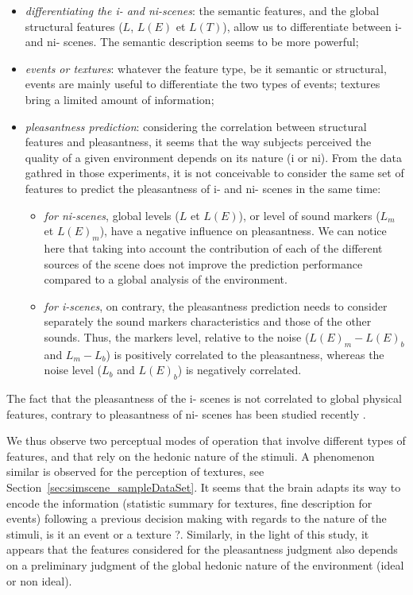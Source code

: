 \documentclass[twoside,twocolumn]{article}
\begin{document}
\begin{itemize}
\item \emph{differentiating the i- and ni-scenes}: the semantic features, and the global structural features ($L$, $L(E)$ et $L(T)$), allow us to differentiate between i- and ni- scenes. The semantic description seems to be more powerful;
\item \emph{events or textures}: whatever the feature type, be it semantic or structural, events are mainly useful to differentiate the two types of events; textures bring a limited amount of information;
\item \emph{pleasantness prediction}: considering the correlation between structural features and pleasantness, it seems that the way subjects perceived the quality of a given environment depends on its nature (i or ni). From the data gathred in those experiments, it is not conceivable to consider the same set of features to predict the pleasantness of i- and ni- scenes in the same time:

\begin{itemize}

\item \emph{for ni-scenes}, global levels ($L$ et $L(E)$), or level of sound markers ($L_m$ et $L(E)_{m}$), have a negative influence on pleasantness. We can notice here that taking into account the contribution of each of the different sources of the scene does not improve the prediction performance compared to a global analysis of the environment.

\item \emph{for i-scenes}, on contrary, the pleasantness prediction needs to consider separately the sound markers characteristics and those of the other sounds. Thus, the markers level, relative to the noise ($L(E)_m-L(E)_b$ and $L_m-L_b$) is positively correlated to the pleasantness, whereas the noise level ($L_b$ and $L(E)_b$) is negatively correlated.
\end{itemize}
\end{itemize}

The fact that the pleasantness of the i- scenes is not correlated to global physical features, contrary to pleasantness of ni- scenes has been studied recently \cite{gozalo2015relationship}.

We thus observe two perceptual modes of operation that involve different types of features, and that rely on the hedonic nature  of the stimuli. A phenomenon similar is observed for the perception of textures, see Section~\ref{sec:simscene_sampleDataSet}. It seems that the brain adapts its way to encode the information (statistic summary for textures, fine description for events) following a previous decision making with regards to the nature of the stimuli, \ie is it an event or a texture ?. Similarly, in the light of this study, it appears that the features considered for the pleasantness judgment also depends on a preliminary judgment of the global hedonic nature of the environment (ideal or non ideal).
\end{document}
